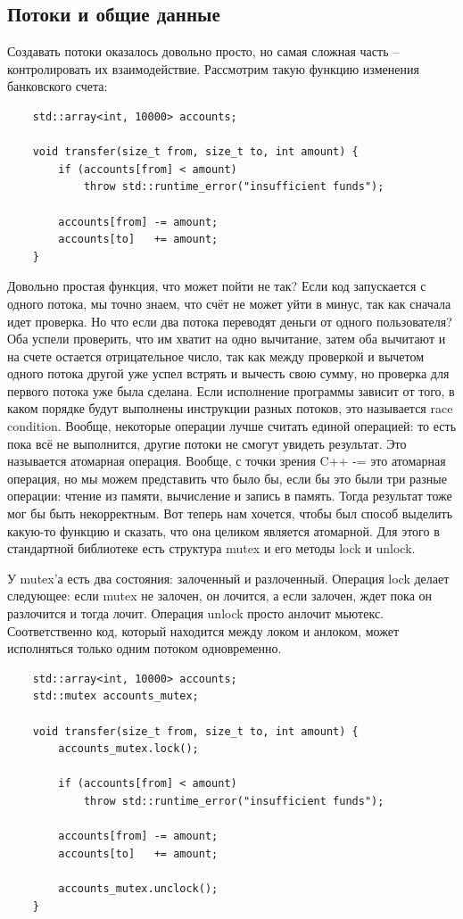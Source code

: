 \documentclass[12pt, a4paper]{article}
\begin{document}
\subsection{Потоки и общие данные}
Создавать потоки оказалось довольно просто, но самая сложная часть -- контролировать их взаимодействие. Рассмотрим такую функцию изменения банковского счета:
\begin{verbatim}
	std::array<int, 10000> accounts;
	
	void transfer(size_t from, size_t to, int amount) {
		if (accounts[from] < amount)
			throw std::runtime_error("insufficient funds");
		
		accounts[from] -= amount;
		accounts[to]   += amount;
	}
\end{verbatim}
Довольно простая функция, что может пойти не так? Если код запускается с одного потока, мы точно знаем, что счёт не может уйти в минус, так как сначала идет проверка. Но что если два потока переводят деньги от одного пользователя? Оба успели проверить, что им хватит на одно вычитание, затем оба вычитают и на счете остается отрицательное число, так как между проверкой и вычетом одного потока другой уже успел встрять и вычесть свою сумму, но проверка для первого потока уже была сделана. Если исполнение программы зависит от того, в каком порядке будут выполнены инструкции разных потоков, это называется race condition. Вообще, некоторые операции лучше считать единой операцией: то есть пока всё не выполнится, другие потоки не смогут увидеть результат. Это называется атомарная операция. Вообще, с точки зрения C++ -= это атомарная операция, но мы можем представить что было бы, если бы это были три разные операции: чтение из памяти, вычисление и запись в память. Тогда результат тоже мог бы быть некорректным. Вот теперь нам хочется, чтобы был способ выделить какую-то функцию и сказать, что она целиком является атомарной. Для этого в стандартной библиотеке есть структура mutex и его методы lock и unlock.
\par У mutex'а есть два состояния: залоченный и разлоченный. Операция lock делает следующее: если mutex не залочен, он лочится, а если залочен, ждет пока он разлочится и тогда лочит. Операция unlock просто анлочит мьютекс. Соответственно код, который находится между локом и анлоком, может исполняться только одним потоком одновременно. 
\begin{verbatim}
	std::array<int, 10000> accounts;
	std::mutex accounts_mutex;
	
	void transfer(size_t from, size_t to, int amount) {
		accounts_mutex.lock();
		
		if (accounts[from] < amount)
			throw std::runtime_error("insufficient funds");
		
		accounts[from] -= amount;
		accounts[to]   += amount;
		
		accounts_mutex.unclock();
	}
\end{verbatim}
\end{document}
